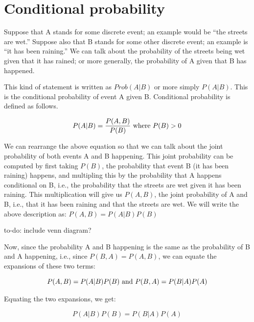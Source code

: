 \documentclass[12pt,]{krantz}
\makeatletter
\newenvironment{kframe}{%
\medskip{}
\setlength{\fboxsep}{.8em}
 \def\at@end@of@kframe{}%
 \ifinner\ifhmode%
  \def\at@end@of@kframe{\end{minipage}}%
  \begin{minipage}{\columnwidth}%
 \fi\fi%
 \def\FrameCommand##1{\hskip\@totalleftmargin \hskip-\fboxsep
 \colorbox{shadecolor}{##1}\hskip-\fboxsep
     \hskip-\linewidth \hskip-\@totalleftmargin \hskip\columnwidth}%
 \MakeFramed {\advance\hsize-\width
   \@totalleftmargin\z@ \linewidth\hsize
   \@setminipage}}%
 {\par\unskip\endMakeFramed%
 \at@end@of@kframe}
\newenvironment{rmdblock}[1]
  {
  \begin{itemize}
  \renewcommand{\labelitemi}{
    \raisebox{-.7\height}[0pt][0pt]{
      {\setkeys{Gin}{width=3em,keepaspectratio}\texttt{[image: images/\#1]}}
    }
  }
  \setlength{\fboxsep}{1em}
  \begin{kframe}
  \item
  }
  {
  \end{kframe}
  \end{itemize}
  }
\newenvironment{rmdnote}
  {\begin{rmdblock}{note}}
  {\end{rmdblock}}
\theoremstyle{definition}
\theoremstyle{definition}
\theoremstyle{definition}
\theoremstyle{remark}
\makeatother
\begin{document}
\hypertarget{conditional-probability}{%
\section{Conditional probability}\label{conditional-probability}}

Suppose that A stands for some discrete event; an example would be ``the streets are wet.'' Suppose also that B stands for some other discrete event; an example is ``it has been raining.'' We can talk about the probability of the streets being wet given that it has rained; or more generally, the probability of A given that B has happened.

This kind of statement is written as \(Prob(A|B)\) or more simply \(P(A|B)\). This is the conditional probability of event A given B. Conditional probability is defined as follows.

\begin{equation} 
P(A|B)= \frac{P(A,B)}{P(B)} \hbox{ where } P(B)>0
\end{equation}

We can rearrange the above equation so that we can talk about the joint probability of both events A and B happening. This joint probability can be computed by first taking \(P(B)\), the probability that event B (it has been raining) happens, and multipling this by the probability that A happens conditional on B, i.e., the probability that the streets are wet given it has been raining. This multiplication will give us \(P(A,B)\), the joint probability of A and B, i.e., that it has been raining and that the streets are wet. We will write the above description as: \(P(A,B)=P(A|B)P(B)\)

\begin{rmdnote}
to-do: include venn diagram?
\end{rmdnote}

Now, since the probability A and B happening is the same as the probability of B and A happening, i.e., since \(P(B,A)=P(A,B)\), we can equate the expansions of these two terms:

\begin{equation}
P(A,B) = P(A|B) P(B) \hbox{ and } P(B,A) = P(B|A)P(A) 
\end{equation}

Equating the two expansions, we get:

\begin{equation}
P(A|B) P(B) = P(B|A)P(A) 
\end{equation}
\end{document}
